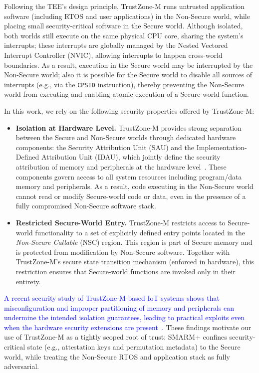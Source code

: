 \documentclass[journal]{IEEEtran}
\newcommand\ben[1]{\textcolor{blue}{#1}}
\newcommand{\rtsmarm}{SMARM+\xspace}
\begin{document}
Following the TEE's design principle, TrustZone-M runs untrusted application software (including RTOS and user applications) in the Non-Secure world, while placing small security-critical software in the Secure world.
Although isolated, both worlds still execute on the same physical CPU core, sharing the system's interrupts;
these interrupts are globally managed by the Nested Vectored Interrupt Controller (NVIC), allowing interrupts to happen cross-world boundaries.
As a result, execution in the Secure world may be interrupted by the Non-Secure world; also it is possible for the Secure world to disable all sources of interrupts (e.g., via the \texttt{CPSID} instruction), thereby preventing the Non-Secure world from executing and enabling atomic execution of a Secure-world function.

In this work, we rely on the following security properties offered by TrustZone-M:

\begin{itemize}
    \item \textbf{Isolation at Hardware Level.}
    TrustZone-M provides strong separation between the Secure and Non-Secure worlds through dedicated hardware components: the Security Attribution Unit (SAU) and the Implementation-Defined Attribution Unit (IDAU), which jointly define the security attribution of memory and peripherals at the hardware level~\cite{arm-trustzone-cm}.
    These components govern access to all system resources including program/data memory and peripherals.
    As a result, code executing in the Non-Secure world cannot read or modify Secure-world code or data, even in the presence of a fully compromised Non-Secure software stack.

    \item \textbf{Restricted Secure-World Entry.}
    TrustZone-M restricts access to Secure-world functionality to a set of explicitly defined entry points located in the \emph{Non-Secure Callable} (NSC) region.
    This region is part of Secure memory and is protected from modification by Non-Secure software.
    Together with TrustZone-M's secure state transition mechanism (enforced in hardware), this restriction ensures that Secure-world functions are invoked only in their entirety.
\end{itemize}


\ben{A recent security study of TrustZone-M-based IoT systems shows that misconfiguration and improper partitioning of memory and peripherals can undermine the intended isolation guarantees, leading to practical exploits even when the hardware security extensions are present~\cite{tzm-sec-iot}.}
These findings motivate our use of TrustZone-M as a tightly scoped root of trust: \rtsmarm confines security-critical state (e.g., attestation keys and permutation
metadata) to the Secure world, while treating the Non-Secure RTOS and application stack as fully adversarial.
\end{document}
